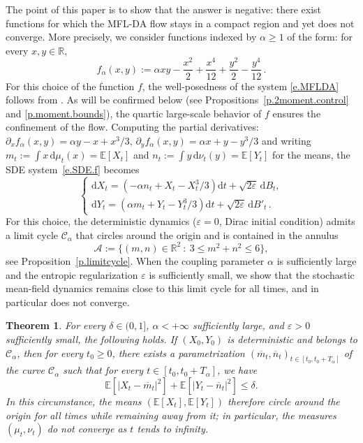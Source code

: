 \documentclass[11pt]{amsart}
\newtheorem{theorem}[proposition]{Theorem}
\theoremstyle{remark}
\theoremstyle{definition}
\numberwithin{equation}{section}
\numberwithin{proposition}{section}
\newcommand{\R}{\mathbb{R}}
\newcommand{\ep}{\varepsilon}
\renewcommand{\le}{\leqslant}
\renewcommand{\ge}{\geqslant}
\renewcommand{\bar}{\overline}
\newcommand{\Ll}{\left}
\newcommand{\Rr}{\right}
\renewcommand{\d}{\mathrm{d}}
\newcommand{\dr}{\partial}
\newcommand{\1}{\mathbf{1}}
\newcommand{\msc}{\mathscr}
\newcommand{\al}{\alpha}
\newcommand{\de}{\delta}
\newcommand{\E}{\mathbb E}
\begin{document}
The point of this paper is to show that the answer is negative: there exist functions for which the MFL-DA flow stays in a compact region and yet does not converge. More precisely, we consider functions indexed by $\alpha \ge 1$ of the form: for every $x,y \in \R$,
%
\begin{equation}  
\label{e.def.f}
f_\al(x,y) := \al xy - \frac{x^2}{2} + \frac{x^4}{12} + \frac{y^2}{2} - \frac{y^4}{12}\, .
\end{equation}
%
For this choice of the function $f$, the well-posedness of the system \eqref{e.MFLDA} follows from \cite{dosreis2019freidlin, hong2024mckean}. As will be confirmed below (see Propositions~\ref{p.2moment.control} and \ref{p.moment.bounds}), the quartic large-scale behavior of $f$ ensures the confinement of the flow. 
%
Computing the partial derivatives: $\dr_x f_\al(x,y) = \al y - x + x^3/3,\, \dr_y f_\al(x,y) = \al x + y - y^3/3$ and writing $m_t := \int x \, \d \mu_t(x) = \E[X_t]$ and $n_t := \int y \, \d \nu_t(y) = \E[Y_t]$ for the means, the SDE system~\eqref{e.SDE.f} becomes
%
\begin{equation}
\label{e.SDEexplicit}
\begin{cases}
    \displaystyle{\d X_t = \Ll( -\al n_t + X_t - X_t^3/3 \Rr) \d t + \sqrt{2\ep} \, \d B_t, }\\
    \displaystyle{\d Y_t = \Ll( \al m_t + Y_t - Y_t^3/3 \Rr) \d t + \sqrt{2\ep} \, \d B'_t \, .}
\end{cases}
\end{equation}
%
For this choice, the deterministic dynamics ($\varepsilon = 0$, Dirac initial condition) admits a limit cycle $\msc C_\alpha$ that circles around the origin and is contained in the annulus
\begin{equation}
\label{e.def.mclA}
\mathcal{A} :=\{(m,n) \in \R^2 \ : \ 3 \le m^2 + n^2 \le 6\},
\end{equation}
see Proposition~\ref{p.limitcycle}. When the coupling parameter $\alpha$ is sufficiently large and the entropic regularization $\varepsilon$ is sufficiently small, we show that the stochastic mean-field dynamics remains close to this limit cycle for all times, and in particular does not converge. 
%
\begin{theorem}
\label{t.main}
For every $\de \in (0,1]$, $\al < +\infty$ sufficiently large, and $\ep > 0$ sufficiently small, the following holds. If $(X_0, Y_0)$ is deterministic and belongs to $\msc C_\al$, then for every $t_0 \ge 0$, there exists a parametrization $(\bar m_t, \bar n_t)_{t \in [t_0,t_0 + T_\al]}$ of the curve $\msc C_\al$ such that for every $t \in [t_0, t_0 + T_\al]$, we have
%
\begin{equation*}  %
\E[|X_t - \bar m_t|^2] + \E[|Y_t - \bar n_t|^2] \le \delta.
\end{equation*}
%
In this circumstance, the means $(\E[X_t], \E[Y_t])$ therefore circle around the origin for all times while remaining away from it; in particular, the measures $(\mu_t, \nu_t)$ do not converge as $t$ tends to infinity.
\end{theorem}
\end{document}
